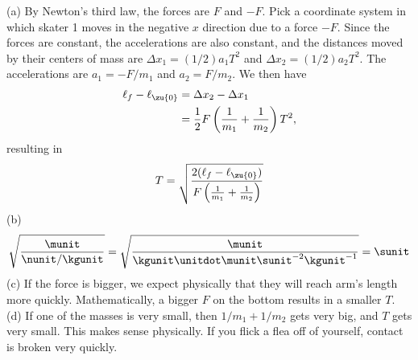 (a) By Newton's third law, the forces are $F$ and $-F$. Pick a coordinate system in which skater 1
moves in the negative $x$ direction due to a force $-F$.
Since the forces are constant, the accelerations are also constant, and
the distances moved by their centers of mass are $\Delta x_1=(1/2)a_1T^2$ and
$\Delta x_2=(1/2)a_2T^2$. The accelerations are $a_1=-F/m_1$ and
$a_2=F/m_2$. We then have
\begin{align*}
  \ell_f-\ell_\zu{0} &= \Delta x_2-\Delta x_1 \\
                     &= \frac{1}{2} F \left(\frac{1}{m_1}+\frac{1}{m_2}\right)T^2,
\end{align*}
resulting in
\begin{equation*}
  T = \sqrt{\frac{2(\ell_f-\ell_\zu{0})}{F\left(\frac{1}{m_1}+\frac{1}{m_2}\right)}}
\end{equation*}
(b) 
\begin{equation*}
  \sqrt{\frac{\munit}{\nunit/\kgunit}} = \sqrt{\frac{\munit}{\kgunit\unitdot\munit\sunit^{-2}\kgunit^{-1}}}
              = \sunit
\end{equation*}
(c) If the force is bigger, we expect physically that they will reach arm's length more quickly.
Mathematically, a bigger $F$ on the bottom results in a smaller $T$.\\
(d) If one of the masses is very small, then $1/m_1+1/m_2$ gets very big, and $T$ gets very small.
This makes sense physically. If you flick a flea off of yourself, contact is broken very quickly.
